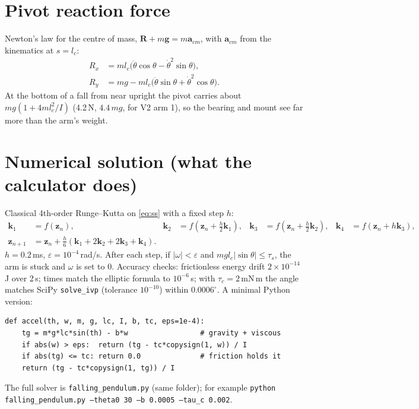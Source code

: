 \documentclass[10pt]{article}
\begin{document}
\section{Pivot reaction force}
Newton's law for the centre of mass, $\bm R+m\bm g=m\bm a_{cm}$, with $\bm a_{cm}$ from the kinematics at $s=l_c$:
\begin{align}
R_x &= ml_c\big(\ddot\theta\cos\theta-\dot\theta^2\sin\theta\big), \\
R_y &= mg-ml_c\big(\ddot\theta\sin\theta+\dot\theta^2\cos\theta\big).
\end{align}
At the bottom of a fall from near upright the pivot carries about $mg(1+4ml_c^2/I)$ (4.2\,N, $4.4\,mg$, for V2 arm 1), so the bearing and mount see far more than the arm's weight.

\section{Numerical solution (what the calculator does)}\label{sec:numeric}
Classical 4th-order Runge--Kutta on \eqref{eq:ss} with a fixed step $h$:
\begin{align*}
\bm k_1&=f(\bm z_n), & \bm k_2&=f(\bm z_n+\tfrac h2\bm k_1), & \bm k_3&=f(\bm z_n+\tfrac h2\bm k_2), & \bm k_4&=f(\bm z_n+h\bm k_3),\\
\bm z_{n+1}&=\bm z_n+\tfrac h6(\bm k_1+2\bm k_2+2\bm k_3+\bm k_4).
\end{align*}
$h=0.2$\,ms, $\varepsilon=10^{-4}$\,rad/s. After each step, if $|\omega|<\varepsilon$ and $mgl_c|\sin\theta|\le\tau_s$, the arm is stuck and $\omega$ is set to 0. Accuracy checks: frictionless energy drift $2\times10^{-14}$\,J over 2\,s; times match the elliptic formula to $10^{-6}$\,s; with $\tau_c=2$\,mN\,m the angle matches SciPy \texttt{solve\_ivp} (tolerance $10^{-10}$) within $0.0006^\circ$. A minimal Python version:
\begin{verbatim}
def accel(th, w, m, g, lc, I, b, tc, eps=1e-4):
    tg = m*g*lc*sin(th) - b*w                 # gravity + viscous
    if abs(w) > eps:  return (tg - tc*copysign(1, w)) / I
    if abs(tg) <= tc: return 0.0              # friction holds it
    return (tg - tc*copysign(1, tg)) / I
\end{verbatim}
The full solver is \texttt{falling\_pendulum.py} (same folder); for example \texttt{python falling\_pendulum.py --theta0 30 --b 0.0005 --tau\_c 0.002}.
\end{document}
